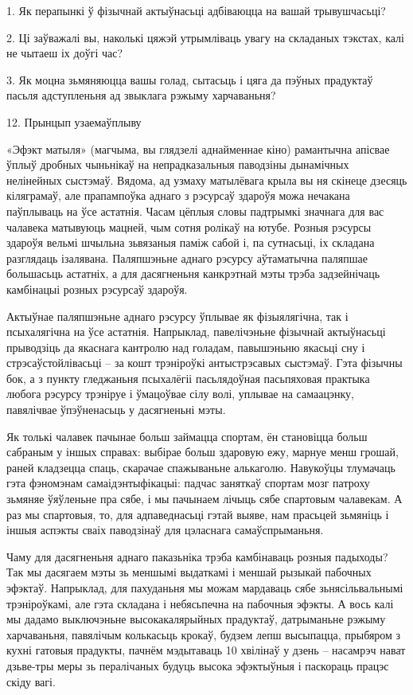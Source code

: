 1. Як перапынкі ў фізычнай актыўнасьці адбіваюцца на вашай трывушчасьці?

2. Ці заўважалі вы, наколькі цяжэй утрымліваць увагу на складаных тэкстах, калі не чытаеш іх доўгі час?

3. Як моцна зьмяняюцца вашы голад, сытасьць і цяга да пэўных прадуктаў пасьля адступленьня ад звыклага рэжыму харчаваньня?


12. Прынцып узаемаўплыву

«Эфэкт матыля» (магчыма, вы глядзелі аднайменнае кіно) рамантычна апісвае ўплыў дробных чыньнікаў на непрадказальныя паводзіны дынамічных нелінейных сыстэмаў. Вядома, ад узмаху матылёвага крыла вы ня скінеце дзесяць кіляграмаў, але прапампоўка аднаго з рэсурсаў здароўя можа нечакана паўплываць на ўсе астатнія. Часам цёплыя словы падтрымкі значнага для вас чалавека матывуюць мацней, чым сотня ролікаў на ютубе. Розныя рэсурсы здароўя вельмі шчыльна зьвязаныя паміж сабой і, па сутнасьці, іх складана разглядаць ізалявана. Паляпшэньне аднаго рэсурсу аўтаматычна паляпшае большасьць астатніх, а для дасягненьня канкрэтнай мэты трэба задзейнічаць камбінацыі розных рэсурсаў здароўя.

Актыўнае паляпшэньне аднаго рэсурсу ўплывае як фізыялягічна, так і псыхалягічна на ўсе астатнія. Напрыклад, павелічэньне фізычнай актыўнасьці прыводзіць да якаснага кантролю над голадам, павышэньню якасьці сну і стрэсаўстойлівасьці – за кошт трэніроўкі антыстрэсавых сыстэмаў. Гэта фізычны бок, а з пункту гледжаньня псыхалёгіі пасьлядоўная пасьпяховая практыка любога рэсурсу трэніруе і ўмацоўвае сілу волі, уплывае на самаацэнку, павялічвае ўпэўненасьць у дасягненьні мэты.

Як толькі чалавек пачынае больш займацца спортам, ён становіцца больш сабраным у іншых справах: выбірае больш здаровую ежу, марнуе менш грошай, раней кладзецца спаць, скарачае спажываньне алькаголю. Навукоўцы тлумачаць гэта фэномэнам самаідэнтыфікацыі: падчас заняткаў спортам мозг патроху зьмяняе ўяўленьне пра сябе, і мы пачынаем лічыць сябе спартовым чалавекам. А раз мы спартовыя, то, для адпаведнасьці гэтай выяве, нам прасьцей зьмяніць і іншыя аспэкты сваіх паводзінаў для цэласнага самаўспрыманьня.

Чаму для дасягненьня аднаго паказьніка трэба камбінаваць розныя падыходы? Так мы дасягаем мэты зь меншымі выдаткамі і меншай рызыкай пабочных эфэктаў. Напрыклад, для пахуданьня мы можам мардаваць сябе зьнясільвальнымі трэніроўкамі, але гэта складана і небясьпечна на пабочныя эфэкты. А вось калі мы дадамо выключэньне высокакалярыйных прадуктаў, датрыманьне рэжыму харчаваньня, павялічым колькасьць крокаў, будзем лепш высыпацца, прыбяром з кухні гатовыя прадукты, пачнём мэдытаваць 10 хвілінаў у дзень – насамрэч нават дзьве-тры меры зь пералічаных будуць высока эфэктыўныя і паскораць працэс скіду вагі.

